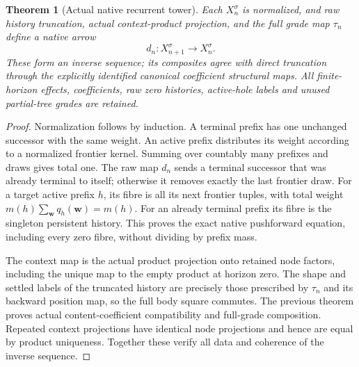 \documentclass[11pt]{article}
\newtheorem{theorem}{Theorem}\newtheorem{proposition}[theorem]{Proposition}
\begin{document}
\begin{theorem}[Actual native recurrent tower]
Each $X_n^\sigma$ is normalized, and raw history truncation, actual context-product projection, and the full grade map $\tau_n$ define a native arrow
\[
 d_n:X_{n+1}^\sigma\longrightarrow X_n^\sigma.
\]
These form an inverse sequence; its composites agree with direct truncation through the explicitly identified canonical coefficient structural maps. All finite-horizon effects, coefficients, raw zero histories, active-hole labels and unused partial-tree grades are retained.
\end{theorem}
\begin{proof}
Normalization follows by induction. A terminal prefix has one unchanged successor with the same weight. An active prefix distributes its weight according to a normalized frontier kernel. Summing over countably many prefixes and draws gives total one. The raw map $d_n$ sends a terminal successor that was already terminal to itself; otherwise it removes exactly the last frontier draw. For a target active prefix $h$, its fibre is all its next frontier tuples, with total weight $m(h)\sum_{\mathbf w}q_h(\mathbf w)=m(h)$. For an already terminal prefix its fibre is the singleton persistent history. This proves the exact native pushforward equation, including every zero fibre, without dividing by prefix mass.

The context map is the actual product projection onto retained node factors, including the unique map to the empty product at horizon zero. The shape and settled labels of the truncated history are precisely those prescribed by $\tau_n$ and its backward position map, so the full body square commutes. The previous theorem proves actual content-coefficient compatibility and full-grade composition. Repeated context projections have identical node projections and hence are equal by product uniqueness. Together these verify all data and coherence of the inverse sequence.
\end{proof}
\end{document}
